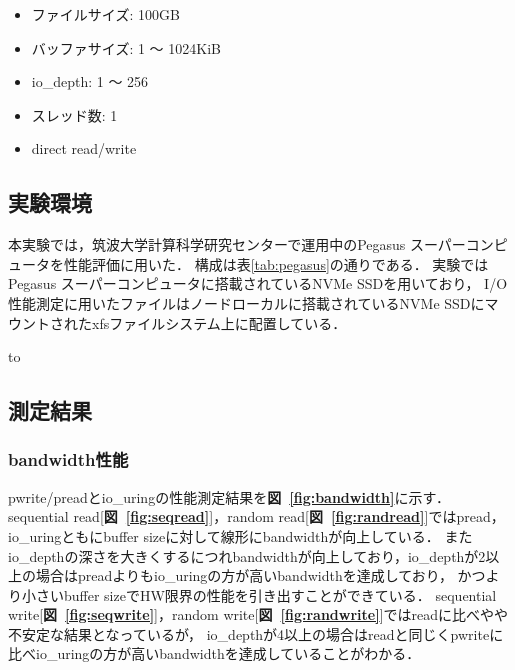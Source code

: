 \documentclass[a4paper,11pt]{jreport}
\newcommand\figref[1]{\textbf{図~\ref{fig:#1}}}
\begin{document}
\begin{itemize}
	\item ファイルサイズ: 100GB
	\item バッファサイズ: 1 〜 1024KiB
	\item io\_depth: 1 〜 256
	\item スレッド数: 1
	\item direct read/write
\end{itemize}

\subsection{実験環境}
本実験では，筑波大学計算科学研究センターで運用中のPegasus スーパーコンピュータを性能評価に用いた．
構成は表\ref{tab:pegasus}の通りである．
実験ではPegasus スーパーコンピュータに搭載されているNVMe SSDを用いており，
I/O性能測定に用いたファイルはノードローカルに搭載されているNVMe SSDにマウントされたxfsファイルシステム上に配置している．


\begin{table}[ht!]
	\centering
	\caption{Pegasus システムの概要}
	\label{tab:pegasus}
	\hbox to 
\end{table}

\subsection{測定結果}
\subsubsection{bandwidth性能}
pwrite/preadとio\_uringの性能測定結果を\figref{bandwidth}に示す．
sequential read[\figref{seqread}]，random read[\figref{randread}]ではpread，io\_uringともにbuffer sizeに対して線形にbandwidthが向上している．
またio\_depthの深さを大きくするにつれbandwidthが向上しており，io\_depthが2以上の場合はpreadよりもio\_uringの方が高いbandwidthを達成しており，
かつより小さいbuffer sizeでHW限界の性能を引き出すことができている．
sequential write[\figref{seqwrite}]，random write[\figref{randwrite}]ではreadに比べやや不安定な結果となっているが，
io\_depthが4以上の場合はreadと同じくpwriteに比べio\_uringの方が高いbandwidthを達成していることがわかる．
\end{document}
